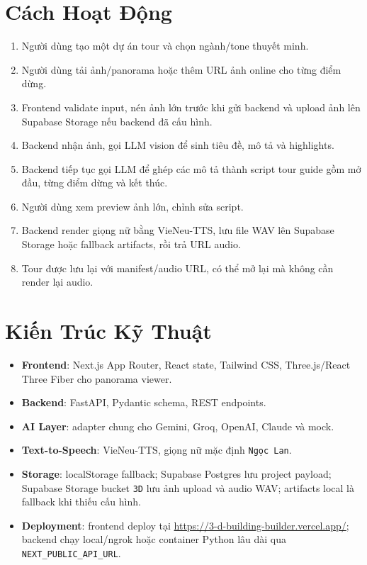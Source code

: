 \documentclass[12pt,a4paper]{article}
\begin{document}
\section{Cách Hoạt Động}

\begin{enumerate}
  \item Người dùng tạo một dự án tour và chọn ngành/tone thuyết minh.
  \item Người dùng tải ảnh/panorama hoặc thêm URL ảnh online cho từng điểm dừng.
  \item Frontend validate input, nén ảnh lớn trước khi gửi backend và upload ảnh lên Supabase Storage nếu backend đã cấu hình.
  \item Backend nhận ảnh, gọi LLM vision để sinh tiêu đề, mô tả và highlights.
  \item Backend tiếp tục gọi LLM để ghép các mô tả thành script tour guide gồm mở đầu, từng điểm dừng và kết thúc.
  \item Người dùng xem preview ảnh lớn, chỉnh sửa script.
  \item Backend render giọng nữ bằng VieNeu-TTS, lưu file WAV lên Supabase Storage hoặc fallback artifacts, rồi trả URL audio.
  \item Tour được lưu lại với manifest/audio URL, có thể mở lại mà không cần render lại audio.
\end{enumerate}

\section{Kiến Trúc Kỹ Thuật}

\begin{itemize}
  \item \textbf{Frontend}: Next.js App Router, React state, Tailwind CSS, Three.js/React Three Fiber cho panorama viewer.
  \item \textbf{Backend}: FastAPI, Pydantic schema, REST endpoints.
  \item \textbf{AI Layer}: adapter chung cho Gemini, Groq, OpenAI, Claude và mock.
  \item \textbf{Text-to-Speech}: VieNeu-TTS, giọng nữ mặc định \texttt{Ngọc Lan}.
  \item \textbf{Storage}: localStorage fallback; Supabase Postgres lưu project payload; Supabase Storage bucket \texttt{3D} lưu ảnh upload và audio WAV; artifacts local là fallback khi thiếu cấu hình.
  \item \textbf{Deployment}: frontend deploy tại \url{https://3-d-building-builder.vercel.app/}; backend chạy local/ngrok hoặc container Python lâu dài qua \texttt{NEXT\_PUBLIC\_API\_URL}.
\end{itemize}
\end{document}
